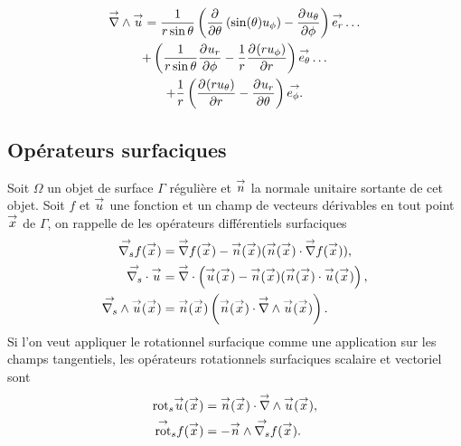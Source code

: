     \begin{multline}
        \vrot \vu = \frac{1}{r\sin\theta}\left(\ddr{\theta}{}\left(\sin(\theta)u_\phi\right) - \ddr{\phi}{u_\theta}\right)\vect{e_r}\dots
        \\
        + \left(\frac{1}{r\sin\theta}\ddr{\phi}{u_r} - \frac{1}{r}\ddr{r}{(ru_\phi)} \right)\vect{e_\theta} \dots
        \\
        + \frac{1}{r}\left(\ddr{r}{(ru_\theta)}-\ddr{\theta}{u_r}\right)\vect{e_\phi.}
    \end{multline}

\subsection{Opérateurs surfaciques}

    Soit \(\Omega\) un objet de surface \(\Gamma\) régulière et \(\vn\) la normale unitaire sortante de cet objet.
    Soit \(f\) et \(\vu\) une fonction et un champ de vecteurs dérivables en tout point \(\vx\) de \(\Gamma\), on rappelle de \cite{nedelec_acoustic_2001} les opérateurs différentiels surfaciques
    \begin{align}
        \vgrads{f}(\vx) &= \vgrad{f}(\vx) - \vn(\vx) (\vn(\vx) \cdot \vgrad{f}(\vx)),
        \\
        \vdivs{\vu} &= \vdiv\left(\vu(\vx) - \vn(\vx) (\vn(\vx) \cdot \vu(\vx)\right),
        \\
        \vrots{\vu}(\vx) &= \vn(\vx)\left(\vn(\vx) \cdot \vrot{\vu}(\vx)\right).
    \end{align}
    Si l'on veut appliquer le rotationnel surfacique comme une application sur les champs tangentiels, les opérateurs rotationnels surfaciques scalaire et vectoriel sont
    \begin{align}
        \trots{\vu}(\vx) &= \vn(\vx) \cdot \vrot{\vu}(\vx),
        \\
        \tvrots{f}(\vx) &= - \vn \pvect \vgrads f(\vx).
    \end{align}
